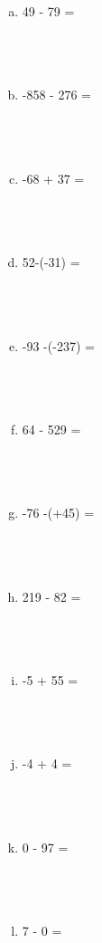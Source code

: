 \documentclass[a4paper,14pt]{article}
\begin{document}
\begin{multicols}{2}
\begin{enumerate}
\begin{enumerate}[a)]
    				\item 49 - 79 =  \\\\\\\\
    				\item -858 - 276 = \\\\\\\\
    				\item -68 + 37 = \\\\\\\\
    				\item 52-(-31) = \\\\\\\\
    				\item -93 -(-237) = \\\\\\\\
    				\item 64 - 529 = \\\\\\\\
    				\item -76 -(+45) = \\\\\\\\
    				\item 219 - 82 = \\\\\\\\
    				\item -5 + 55 = \\\\\\\\
    				\item -4 + 4 = \\\\\\\\
    				\item 0 - 97 = \\\\\\\\
    				\item 7 - 0 = \\\\\\\\

\end{enumerate}
\end{enumerate}
\end{multicols}
\end{document}
